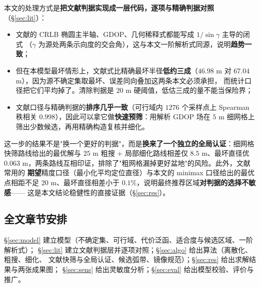 本文的处理方式是\textbf{把文献判据实现成一层代码，逐项与精确判据对照}（§\ref{sec:lit}）：

\begin{itemize}
  \item 文献的 CRLB 椭圆主半轴、GDOP、几何稀释式都能写成 $1/\sin\gamma$ 主导的闭式
        （$\gamma$ 为源处两条示向度的交会角），这与本文一阶解析式同源，说明\textbf{趋势一致}；
  \item 但在本模型最坏情形上，文献式比精确最坏半径\textbf{低约三成}（$46.98$ m 对
        $67.04$ m），因为源不确定集取最坏、误差同向叠加这两条本文必须承担，
        而统计口径把它们平均掉了。清除判据是 $20$ m 硬阈值，低估三成的量不能当保险界；
  \item 文献口径与精确判据的\textbf{排序几乎一致}（可行域内 $1276$ 个采样点上
        Spearman 秩相关 $0.998$），因此可以拿它做\textbf{快速预筛}：用解析 GDOP 场在 $5$ m
        细网格上筛出少数候选，再用精确构造复核并细化。
\end{itemize}

这一步的结果不是"换一个更好的判据"，而是\textbf{换来了一个独立的全局认证}：细网格
快筛路线给出的最优解与 $25$ m 粗搜 $+$ 局部细化路线相差仅 $8.5$ m、最坏直径优
$0.063$ m，两条路线互相印证，排除了"粗网格漏掉更好盆地"的风险。此外，文献常用的
\textbf{期望}精度口径（最小化平均定位直径）与本文的 minimax 口径给出的最优点相距不足
$20$ m、最坏直径相差小于 $0.1\%$，说明最终推荐区域\textbf{对判据的选择不敏感}——
这是本文结论稳健性的直接证据（§\ref{sec:res}）。

\subsection{全文章节安排}

§\ref{sec:model} 建立模型（不确定集、可行域、代价泛函、适合度与候选区域、一阶解析式）；
§\ref{sec:lit} 建立文献判据层并逐项对照；§\ref{sec:algo} 给出算法（离散化、粗搜、细化、
文献快筛与全局认证、候选弧带、镜像规范）；§\ref{sec:res} 给出求解结果与两张成果图；
§\ref{sec:sens} 给出灵敏度分析；§\ref{sec:eval} 给出模型校验、评价与推广。
